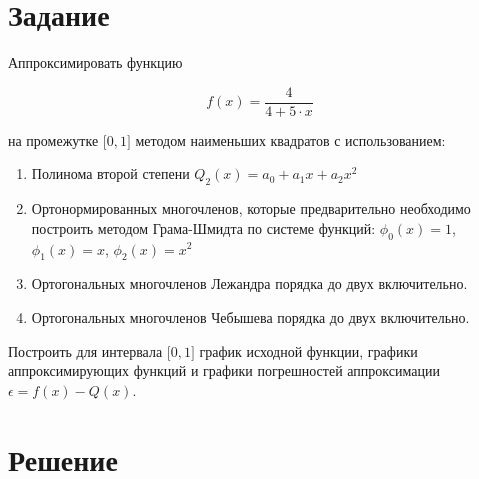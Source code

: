 




\section{Задание}

Аппроксимировать функцию 

\begin{displaymath}
f(x) = \frac{4}{4 + 5 \cdot x}
\end{displaymath}

на промежутке $\Big [ 0, 1 \Big ]$ методом наименьших квадратов с использованием:

\begin{enumerate}

\item Полинома второй степени $Q_2(x) = a_0 + a_1x + a_2x^2$

\item Ортонормированных многочленов, которые предварительно необходимо построить методом Грама-Шмидта по системе функций: $\phi_0(x) = 1$, $\phi_1(x) = x$, $\phi_2(x) = x^2$

\item Ортогональных многочленов Лежандра порядка до двух включительно.

\item Ортогональных многочленов Чебышева порядка до двух включительно.

\end{enumerate}

Построить для интервала $\Big [ 0, 1 \Big ]$ график исходной функции, графики аппроксимирующих функций и графики погрешностей аппроксимации $\epsilon = f(x) - Q(x)$.

\section{Решение}



